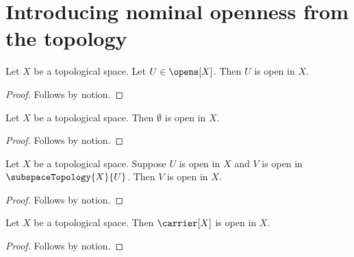 \section{Introducing nominal openness from the topology}



\begin{theorem}\label{membership_open_formation_probe}
    Let $X$ be a topological space.
    Let $U\in\opens[X]$.
    Then $U$ is open in $X$.
\end{theorem}
\begin{proof}
    Follows by notion.
\end{proof}

\begin{theorem}\label{empty_open_formation_probe}
    Let $X$ be a topological space.
    Then $\emptyset$ is open in $X$.
\end{theorem}
\begin{proof}
    Follows by notion.
\end{proof}

\begin{theorem}\label{nested_open_formation_probe}
    Let $X$ be a topological space.
    Suppose $U$ is open in $X$ and $V$ is open in $\subspaceTopology{X}{U}$.
    Then $V$ is open in $X$.
\end{theorem}
\begin{proof}
    Follows by notion.
\end{proof}

\begin{theorem}\label{carrier_open_formation_probe}
    Let $X$ be a topological space.
    Then $\carrier[X]$ is open in $X$.
\end{theorem}
\begin{proof}
    Follows by notion.
\end{proof}
